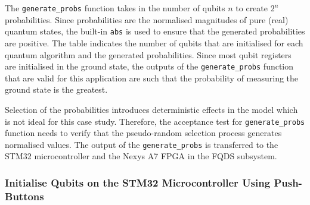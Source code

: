 The \texttt{generate\_probs} function takes in the number of qubits $n$ to create $2^n$ probabilities. Since probabilities are the normalised magnitudes of pure (real) quantum states, the built-in \texttt{abs} is used to ensure that the generated probabilities are positive. The table indicates the number of qubits that are initialised for each quantum algorithm and the generated probabilities. Since most qubit registers are initialised in the ground state, the outputs of the \texttt{generate\_probs} function that are valid for this application are such that the probability of measuring the ground state is the greatest. 

Selection of the probabilities introduces deterministic effects in the model which is not ideal for this case study. Therefore, the acceptance test for \texttt{generate\_probs} function needs to verify that the pseudo-random selection process generates normalised values. The output of the \texttt{generate\_probs} is transferred to the STM32 microcontroller and the Nexys A7 FPGA in the FQDS subsystem. 

\subsubsection{Initialise Qubits on the STM32 Microcontroller Using Push-Buttons}

